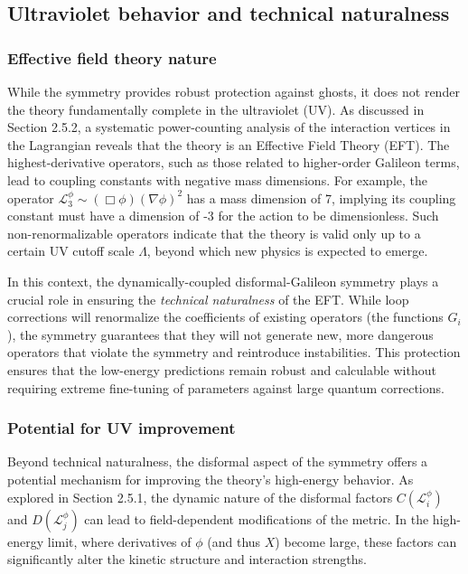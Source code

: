 \documentclass[twocolumn]{aastex631}
\begin{document}
\subsection{Ultraviolet behavior and technical naturalness}

\subsubsection{Effective field theory nature}
While the symmetry provides robust protection against ghosts, it does not render the theory fundamentally complete in the ultraviolet (UV). As discussed in Section 2.5.2, a systematic power-counting analysis of the interaction vertices in the Lagrangian reveals that the theory is an Effective Field Theory (EFT). The highest-derivative operators, such as those related to higher-order Galileon terms, lead to coupling constants with negative mass dimensions. For example, the operator $\mathcal{L}_3^\phi \sim (\Box \phi) (\nabla\phi)^2$ has a mass dimension of 7, implying its coupling constant must have a dimension of -3 for the action to be dimensionless. Such non-renormalizable operators indicate that the theory is valid only up to a certain UV cutoff scale $\Lambda$, beyond which new physics is expected to emerge.

In this context, the dynamically-coupled disformal-Galileon symmetry plays a crucial role in ensuring the \textit{technical naturalness} of the EFT. While loop corrections will renormalize the coefficients of existing operators (the functions $G_i$), the symmetry guarantees that they will not generate new, more dangerous operators that violate the symmetry and reintroduce instabilities. This protection ensures that the low-energy predictions remain robust and calculable without requiring extreme fine-tuning of parameters against large quantum corrections.

\subsubsection{Potential for UV improvement}
Beyond technical naturalness, the disformal aspect of the symmetry offers a potential mechanism for improving the theory's high-energy behavior. As explored in Section 2.5.1, the dynamic nature of the disformal factors $C(\mathcal{L}_i^\phi)$ and $D(\mathcal{L}_j^\phi)$ can lead to field-dependent modifications of the metric. In the high-energy limit, where derivatives of $\phi$ (and thus $X$) become large, these factors can significantly alter the kinetic structure and interaction strengths.
\end{document}

